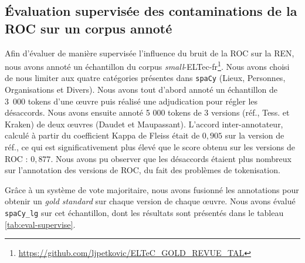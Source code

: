 

\subsection{\'Evaluation supervisée des contaminations de la ROC sur un corpus annoté}
\label{subsec:eval_supervis_OCR-IMPACT-NER}
Afin d'évaluer de manière supervisée l'influence du bruit de la ROC sur la REN, nous avons annoté un échantillon du corpus \textit{small}-ELTec-fr\footnote{\url{https://github.com/ljpetkovic/ELTeC_GOLD_REVUE_TAL}}.
 Nous avons choisi de nous limiter aux quatre catégories présentes dans \texttt{spaCy} (Lieux, Personnes, Organisations et Divers).
  Nous avons tout d'abord annoté un échantillon de 3~000 tokens d'une œuvre  puis réalisé une adjudication pour régler les désaccords. 
  Nous avons ensuite annoté 5 000 tokens de 3 versions (réf., Tess. et Kraken) de deux œuvres (Daudet et Maupassant). %
L'accord inter-annotateur, calculé à partir du coefficient Kappa de Fleiss \cite{fleiss2013statistical} était de $0,905$ sur la version de réf., ce qui est significativement plus élevé que le score obtenu sur les versions de ROC : $0,877$.
 Nous avons pu observer que les désaccords étaient plus nombreux sur l'annotation des versions de ROC, du fait des problèmes de tokenisation.

Grâce à un système de vote majoritaire, nous avons fusionné les annotations pour obtenir un \textit{gold standard} sur chaque version de chaque œuvre.
 Nous avons évalué \texttt{spaCy\_lg} sur cet échantillon, dont les résultats sont présentés dans le tableau \ref{tab:eval-supervise}. 
 
